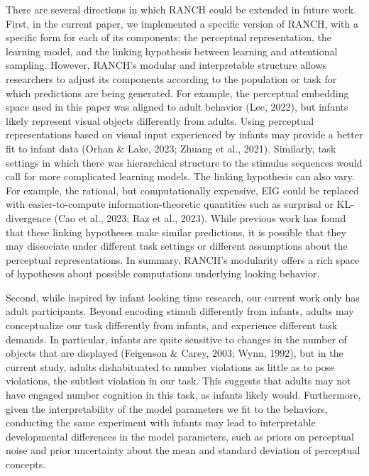\documentclass[10pt, letterpaper]{article}
\begin{document}
There are several directions in which RANCH could be extended in future
work. First, in the current paper, we implemented a specific version of
RANCH, with a specific form for each of its components: the perceptual
representation, the learning model, and the linking hypothesis between
learning and attentional sampling. However, RANCH's modular and
interpretable structure allows researchers to adjust its components
according to the population or task for which predictions are being
generated. For example, the perceptual embedding space used in this
paper was aligned to adult behavior (Lee, 2022), but infants likely
represent visual objects differently from adults. Using perceptual
representations based on visual input experienced by infants may provide
a better fit to infant data (Orhan \& Lake, 2023; Zhuang et al., 2021).
Similarly, task settings in which there was hierarchical structure to
the stimulus sequences would call for more complicated learning models.
The linking hypothesis can also vary. For example, the rational, but
computationally expensive, EIG could be replaced with easier-to-compute
information-theoretic quantities such as surprisal or KL-divergence (Cao
et al., 2023; Raz et al., 2023). While previous work has found that
these linking hypotheses make similar predictions, it is possible that
they may dissociate under different task settings or different
assumptions about the perceptual representations. In summary, RANCH's
modularity offers a rich space of hypotheses about possible computations
underlying looking behavior.

Second, while inspired by infant looking time research, our current work
only has adult participants. Beyond encoding stimuli differently from
infants, adults may conceptualize our task differently from infants, and
experience different task demands. In particular, infants are quite
sensitive to changes in the number of objects that are displayed
(Feigenson \& Carey, 2003; Wynn, 1992), but in the current study, adults
dishabituated to number violations as little as to pose violations, the
subtlest violation in our task. This suggests that adults may not have
engaged number cognition in this task, as infants likely would.
Furthermore, given the interpretability of the model parameters we fit
to the behaviors, conducting the same experiment with infants may lead
to interpretable developmental differences in the model parameters, such
as priors on perceptual noise and prior uncertainty about the mean and
standard deviation of perceptual concepts.
\end{document}
